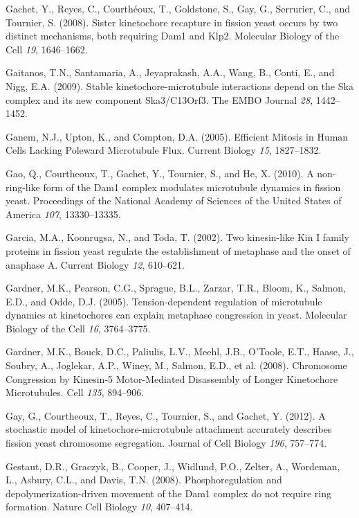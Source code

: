 \documentclass[12pt,a4paper,twoside,openright]{book}
\begin{document}
\hypertarget{ref-Gachet2008a}{}
Gachet, Y., Reyes, C., Courthéoux, T., Goldstone, S., Gay, G.,
Serrurier, C., and Tournier, S. (2008). Sister kinetochore recapture in
fission yeast occurs by two distinct mechanisms, both requiring Dam1 and
Klp2. Molecular Biology of the Cell \emph{19}, 1646--1662.

\hypertarget{ref-Gaitanos2009}{}
Gaitanos, T.N., Santamaria, A., Jeyaprakash, A.A., Wang, B., Conti, E.,
and Nigg, E.A. (2009). Stable kinetochore-microtubule interactions
depend on the Ska complex and its new component Ska3/C13Orf3. The EMBO
Journal \emph{28}, 1442--1452.

\hypertarget{ref-Ganem2005}{}
Ganem, N.J., Upton, K., and Compton, D.A. (2005). Efficient Mitosis in
Human Cells Lacking Poleward Microtubule Flux. Current Biology
\emph{15}, 1827--1832.

\hypertarget{ref-Gao2010}{}
Gao, Q., Courtheoux, T., Gachet, Y., Tournier, S., and He, X. (2010). A
non-ring-like form of the Dam1 complex modulates microtubule dynamics in
fission yeast. Proceedings of the National Academy of Sciences of the
United States of America \emph{107}, 13330--13335.

\hypertarget{ref-Garcia2002d}{}
Garcia, M.A., Koonrugsa, N., and Toda, T. (2002). Two kinesin-like Kin I
family proteins in fission yeast regulate the establishment of metaphase
and the onset of anaphase A. Current Biology \emph{12}, 610--621.

\hypertarget{ref-Gardner2005}{}
Gardner, M.K., Pearson, C.G., Sprague, B.L., Zarzar, T.R., Bloom, K.,
Salmon, E.D., and Odde, D.J. (2005). Tension-dependent regulation of
microtubule dynamics at kinetochores can explain metaphase congression
in yeast. Molecular Biology of the Cell \emph{16}, 3764--3775.

\hypertarget{ref-Gardner2008a}{}
Gardner, M.K., Bouck, D.C., Paliulis, L.V., Meehl, J.B., O'Toole, E.T.,
Haase, J., Soubry, A., Joglekar, A.P., Winey, M., Salmon, E.D., et al.
(2008). Chromosome Congression by Kinesin-5 Motor-Mediated Disassembly
of Longer Kinetochore Microtubules. Cell \emph{135}, 894--906.

\hypertarget{ref-Gay2012a}{}
Gay, G., Courtheoux, T., Reyes, C., Tournier, S., and Gachet, Y. (2012).
A stochastic model of kinetochore-microtubule attachment accurately
describes fission yeast chromosome segregation. Journal of Cell Biology
\emph{196}, 757--774.

\hypertarget{ref-Gestaut2008}{}
Gestaut, D.R., Graczyk, B., Cooper, J., Widlund, P.O., Zelter, A.,
Wordeman, L., Asbury, C.L., and Davis, T.N. (2008). Phosphoregulation
and depolymerization-driven movement of the Dam1 complex do not require
ring formation. Nature Cell Biology \emph{10}, 407--414.
\end{document}
